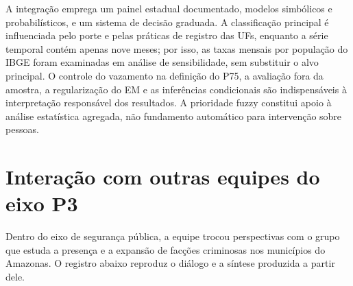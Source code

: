 \documentclass[12pt,a4paper]{article}
\begin{document}
A integração emprega um painel estadual documentado, modelos simbólicos e probabilísticos, e um sistema de decisão graduada. A classificação principal é influenciada pelo porte e pelas práticas de registro das UFs, enquanto a série temporal contém apenas nove meses; por isso, as taxas mensais por população do IBGE foram examinadas em análise de sensibilidade, sem substituir o alvo principal. O controle do vazamento na definição do P75, a avaliação fora da amostra, a regularização do EM e as inferências condicionais são indispensáveis à interpretação responsável dos resultados. A prioridade fuzzy constitui apoio à análise estatística agregada, não fundamento automático para intervenção sobre pessoas.

\section{Interação com outras equipes do eixo P3}
Dentro do eixo de segurança pública, a equipe trocou perspectivas com o grupo que estuda a presença e a expansão de facções criminosas nos municípios do Amazonas. O registro abaixo reproduz o diálogo e a síntese produzida a partir dele.
\end{document}
